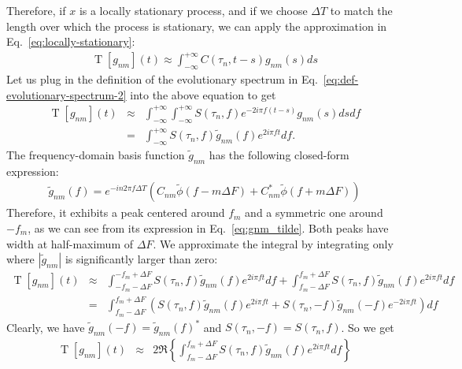 \documentclass{article}
\begin{document}
Therefore, if $x$ is a locally stationary process, and if we choose $\Delta T$ to match the length over which the process is stationary, we can apply the approximation in Eq.~\eqref{eq:locally-stationary}:
\begin{eqnarray}
    \operatorname{T}[g_{nm}](t) \approx \int_{-\infty}^{+\infty} C(\tau_n, t-s) g_{nm}(s) ds
\end{eqnarray}
Let us plug in the definition of the evolutionary spectrum in Eq.~\eqref{eq:def-evolutionary-spectrum-2} into the above equation to get
\begin{eqnarray}
    \operatorname{T}[g_{nm}](t) & \approx & \int_{-\infty}^{+\infty} \int_{-\infty}^{+\infty}  S(\tau_n, f) e^{-2 i \pi f  (t-s)} g_{nm}(s) ds df \nonumber \\
    & = & \int_{-\infty}^{+\infty} S(\tau_n, f) \tilde{g}_{nm}(f) e^{2 i \pi f t}  df.
\end{eqnarray}
The frequency-domain basis function $\tilde{g}_{nm}$ has the following closed-form expression:
\begin{eqnarray}
\label{eq:gnm_tilde}
\tilde{g}_{n m}(f)= e^{-i n 2 \pi f \Delta T}  \left(C_{n m} \tilde{\phi}(f-m \Delta F) +C_{n m}^* \tilde{\phi}(f+m \Delta F)\right)
\end{eqnarray}
Therefore, it exhibits a peak centered around $f_m$ and a symmetric one around $-f_m$, as we can see from its expression in Eq.~\eqref{eq:gnm_tilde}. Both peaks have width at half-maximum of $\Delta F$. We approximate the integral by integrating only where $|\tilde{g}_{nm}|$ is significantly larger than zero:
\begin{eqnarray}
    \operatorname{T}[g_{nm}](t) & \approx & \int_{-f_m-\Delta F}^{-f_m + \Delta F} S(\tau_n, f) \tilde{g}_{nm}(f) e^{2i\pi f t} df + \int_{f_m-\Delta F}^{f_m + \Delta F} S(\tau_n, f) \tilde{g}_{nm}(f) e^{2i\pi f t} df \nonumber \\
    &=& \int_{f_m-\Delta F}^{f_m + \Delta F} \left( S(\tau_n, f) \tilde{g}_{nm}(f) e^{2i\pi f t} + S(\tau_n, -f) \tilde{g}_{nm}(-f) e^{-2i\pi f t}\right) df 
\end{eqnarray}
Clearly, we have $\tilde{g}_{nm}(-f) = \tilde{g}_{nm}(f)^{\ast}$ and $S(\tau_n, -f) = S(\tau_n, f)$. 
So we get
\begin{eqnarray}
    \operatorname{T}[g_{nm}](t) & \approx & 2 \Re \left\{ \int_{f_m-\Delta F}^{f_m + \Delta F} S(\tau_n, f) \tilde{g}_{nm}(f) e^{2i\pi f t} df\right \}
\end{eqnarray}
\end{document}
